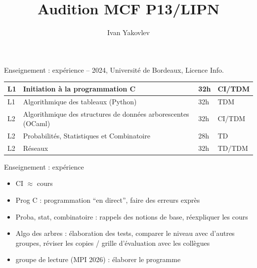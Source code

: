 \documentclass[11pt, aspectratio=149]{beamer}
\title[Audition MCF P13/LIPN]{Audition MCF P13/LIPN}
\author[Ivan Yakovlev]{Ivan Yakovlev}
\institute[MPIM]{}
\date[13 Mai 2026]{}
\begin{document}

\begin{frame}{Enseignement : expérience}
	 -- 2024, Université de Bordeaux, Licence Info.
    \smallskip
\begin{table}
\centering
    \begin{tabular}{|m{}|m{}|m{}|m{}|}
    \hline
    	L1 & Initiation à la programmation C & 32h & CI/TDM \\ \hline
    	L1 & Algorithmique des tableaux (Python) & 32h & TDM \\ \hline
    	L2 & Algorithmique des structures de données arborescentes (OCaml) & 32h & CI/TDM \\ \hline
    	L2 & Probabilités, Statistiques et Combinatoire & 28h & TD \\ \hline
    	L2 & Réseaux & 32h & TD/TDM  \\ \hline
    	
    \end{tabular}
\end{table}
\end{frame}

\begin{frame}{Enseignement : expérience}
	\begin{itemize}
		\item CI $\approx$ cours
		\item Prog C : programmation ``en direct'', faire des erreurs exprès
		\item Proba, stat, combinatoire : rappels des notions de base, réexpliquer les cours
		\item Algo des arbres : élaboration des tests, comparer le niveau avec d'autres groupes, réviser les copies / grille d'évaluation avec les collègues
		\item groupe de lecture (MPI 2026) : élaborer le programme
	\end{itemize}
\end{frame}
\end{document}
